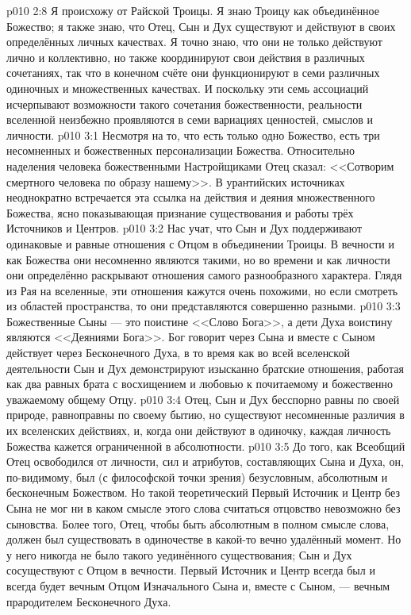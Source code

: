 \vs p010 2:8 Я происхожу от Райской Троицы. Я знаю Троицу как объединённое Божество; я также знаю, что Отец, Сын и Дух существуют и действуют в своих определённых личных качествах. Я точно знаю, что они не только действуют лично и коллективно, но также координируют свои действия в различных сочетаниях, так что в конечном счёте они функционируют в семи различных одиночных и множественных качествах. И поскольку эти семь ассоциаций исчерпывают возможности такого сочетания божественности, реальности вселенной неизбежно проявляются в семи вариациях ценностей, смыслов и личности.
\vs p010 3:1 Несмотря на то, что есть только одно Божество, есть три несомненных и божественных персонализации Божества. Относительно наделения человека божественными Настройщиками Отец сказал: <<Сотворим смертного человека по образу нашему>>. В урантийских источниках неоднократно встречается эта ссылка на действия и деяния множественного Божества, ясно показывающая признание существования и работы трёх Источников и Центров.
\vs p010 3:2 \pc Нас учат, что Сын и Дух поддерживают одинаковые и равные отношения с Отцом в объединении Троицы. В вечности и как Божества они несомненно являются такими, но во времени и как личности они определённо раскрывают отношения самого разнообразного характера. Глядя из Рая на вселенные, эти отношения кажутся очень похожими, но если смотреть из областей пространства, то они представляются совершенно разными.
\vs p010 3:3 Божественные Сыны --- это поистине <<Слово Бога>>, а дети Духа воистину являются <<Деяниями Бога>>. Бог говорит через Сына и вместе с Сыном действует через Бесконечного Духа, в то время как во всей вселенской деятельности Сын и Дух демонстрируют изысканно братские отношения, работая как два равных брата с восхищением и любовью к почитаемому и божественно уважаемому общему Отцу.
\vs p010 3:4 Отец, Сын и Дух бесспорно равны по своей природе, равноправны по своему бытию, но существуют несомненные различия в их вселенских действиях, и, когда они действуют в одиночку, каждая личность Божества кажется ограниченной в абсолютности.
\vs p010 3:5 \pc До того, как Всеобщий Отец освободился от личности, сил и атрибутов, составляющих Сына и Духа, он, по\hyp{}видимому, был (с философской точки зрения) безусловным, абсолютным и бесконечным Божеством. Но такой теоретический Первый Источник и Центр без Сына не мог ни в каком смысле этого слова считаться  отцовство невозможно без сыновства. Более того, Отец, чтобы быть абсолютным в полном смысле слова, должен был существовать в одиночестве в какой\hyp{}то вечно удалённый момент. Но у него никогда не было такого уединённого существования; Сын и Дух сосуществуют с Отцом в вечности. Первый Источник и Центр всегда был и всегда будет вечным Отцом Изначального Сына и, вместе с Сыном, --- вечным прародителем Бесконечного Духа.
